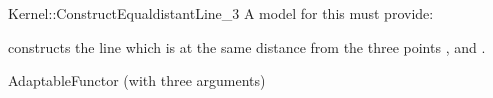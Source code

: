 \begin{ccRefFunctionObjectConcept}{Kernel::ConstructEqualdistantLine_3}
A model for this must provide:


{constructs the line which is at the same distance from the three points
,  and .
}

\ccRefines
AdaptableFunctor (with three arguments)

\ccSeeAlso
{}

\end{ccRefFunctionObjectConcept}
